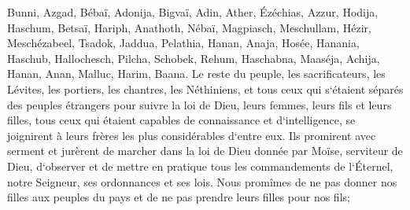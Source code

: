 \verse Bunni, Azgad, Bébaï, 
\verse Adonija, Bigvaï, Adin, 
\verse Ather, Ézéchias, Azzur, 
\verse Hodija, Haschum, Betsaï, 
\verse Hariph, Anathoth, Nébaï, 
\verse Magpiasch, Meschullam, Hézir, 
\verse Meschézabeel, Tsadok, Jaddua, 
\verse Pelathia, Hanan, Anaja, 
\verse Hosée, Hanania, Haschub, 
\verse Hallochesch, Pilcha, Schobek, 
\verse Rehum, Haschabna, Maaséja, 
\verse Achija, Hanan, Anan, 
\verse Malluc, Harim, Baana. 
\verse Le reste du peuple, les sacrificateurs, les Lévites, les portiers, les chantres, les Néthiniens, et tous ceux qui s`étaient séparés des peuples étrangers pour suivre la loi de Dieu, leurs femmes, leurs fils et leurs filles, tous ceux qui étaient capables de connaissance et d`intelligence, 
\verse se joignirent à leurs frères les plus considérables d`entre eux. Ils promirent avec serment et jurèrent de marcher dans la loi de Dieu donnée par Moïse, serviteur de Dieu, d`observer et de mettre en pratique tous les commandements de l`Éternel, notre Seigneur, ses ordonnances et ses lois. 
\verse Nous promîmes de ne pas donner nos filles aux peuples du pays et de ne pas prendre leurs filles pour nos fils; 
